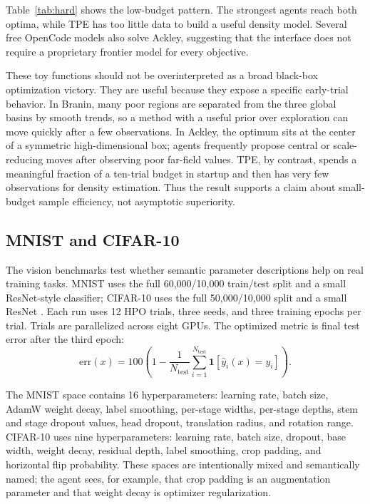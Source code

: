 \documentclass[letterpaper]{article}
\begin{document}
Table~\ref{tab:hard} shows the low-budget pattern. The strongest agents reach
both optima, while TPE has too little data to build a useful density model.
Several free OpenCode models also solve Ackley, suggesting that the interface
does not require a proprietary frontier model for every objective.

These toy functions should not be overinterpreted as a broad black-box
optimization victory. They are useful because they expose a specific early-trial
behavior. In Branin, many poor regions are separated from the three global
basins by smooth trends, so a method with a useful prior over exploration can
move quickly after a few observations. In Ackley, the optimum sits at the
center of a symmetric high-dimensional box; agents frequently propose central
or scale-reducing moves after observing poor far-field values. TPE, by contrast,
spends a meaningful fraction of a ten-trial budget in startup and then has very
few observations for density estimation. Thus the result supports a claim about
small-budget sample efficiency, not asymptotic superiority.

\subsection{MNIST and CIFAR-10}

The vision benchmarks test whether semantic parameter descriptions help on real
training tasks. MNIST uses the full 60,000/10,000 train/test split and a small
ResNet-style classifier; CIFAR-10 uses the full 50,000/10,000 split and a small
ResNet \cite{leCun1998mnist,krizhevsky2009cifar}. Each run uses 12 HPO trials,
three seeds, and three training epochs per trial. Trials are parallelized across
eight GPUs. The optimized metric is final test error after the third epoch:
\begin{equation}
  \mathrm{err}(x)=100\left(1-\frac{1}{N_{\mathrm{test}}}
  \sum_{i=1}^{N_{\mathrm{test}}}\mathbf{1}
  [\hat{y}_i(x)=y_i]\right).
\end{equation}

The MNIST space contains 16 hyperparameters: learning rate, batch size, AdamW
weight decay, label smoothing, per-stage widths, per-stage depths, stem and
stage dropout values, head dropout, translation radius, and rotation range.
CIFAR-10 uses nine hyperparameters: learning rate, batch size, dropout, base
width, weight decay, residual depth, label smoothing, crop padding, and
horizontal flip probability. These spaces are intentionally mixed and
semantically named; the agent sees, for example, that crop padding is an
augmentation parameter and that weight decay is optimizer regularization.
\end{document}
